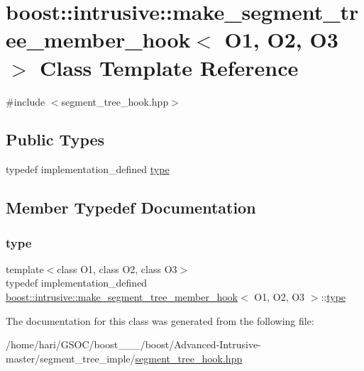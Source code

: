 \hypertarget{classboost_1_1intrusive_1_1make__segment__tree__member__hook}{}\section{boost\+:\+:intrusive\+:\+:make\+\_\+segment\+\_\+tree\+\_\+member\+\_\+hook$<$ O1, O2, O3 $>$ Class Template Reference}
\label{classboost_1_1intrusive_1_1make__segment__tree__member__hook}


{\ttfamily \#include $<$segment\+\_\+tree\+\_\+hook.\+hpp$>$}

\subsection*{Public Types}
\begin{DoxyCompactItemize}
\item 
typedef implementation\+\_\+defined \hyperlink{classboost_1_1intrusive_1_1make__segment__tree__member__hook_a065e56f8c3705474d1e68630bed1c475}{type}
\end{DoxyCompactItemize}


\subsection{Member Typedef Documentation}
\mbox{\label{classboost_1_1intrusive_1_1make__segment__tree__member__hook_a065e56f8c3705474d1e68630bed1c475}} 
\subsubsection{\texorpdfstring{type}{type}}
{\footnotesize\ttfamily template$<$class O1, class O2, class O3$>$ \\
typedef implementation\+\_\+defined \hyperlink{classboost_1_1intrusive_1_1make__segment__tree__member__hook}{boost\+::intrusive\+::make\+\_\+segment\+\_\+tree\+\_\+member\+\_\+hook}$<$ O1, O2, O3 $>$\+::\hyperlink{classboost_1_1intrusive_1_1make__segment__tree__member__hook_a065e56f8c3705474d1e68630bed1c475}{type}}



The documentation for this class was generated from the following file\+:\begin{DoxyCompactItemize}
\item 
/home/hari/\+G\+S\+O\+C/boost\+\_\+\_\+\_/boost/\+Advanced-\/\+Intrusive-\/master/segment\+\_\+tree\+\_\+imple/\hyperlink{segment__tree__hook_8hpp}{segment\+\_\+tree\+\_\+hook.\+hpp}\end{DoxyCompactItemize}
